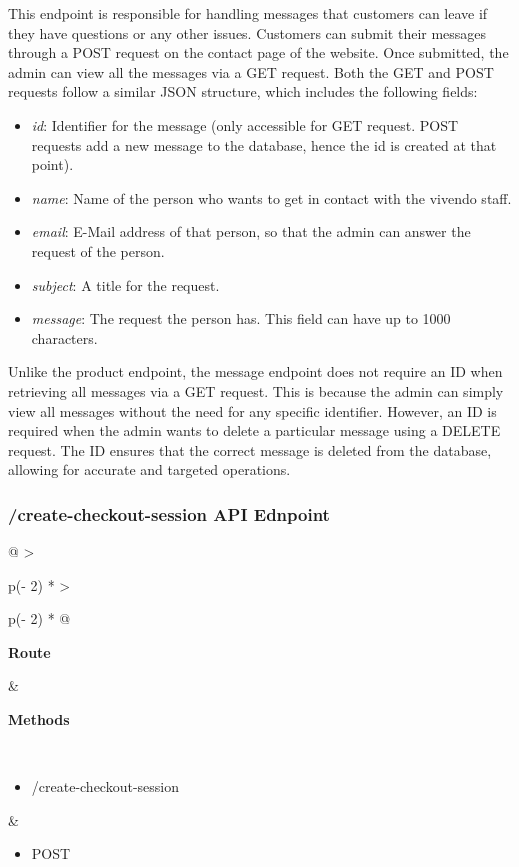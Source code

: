 This endpoint is responsible for handling messages that customers can leave if they have questions or any other issues. Customers can submit their messages through a POST request on the contact page of the website. Once submitted, the admin can view all the messages via a GET request. Both the GET and POST requests follow a similar JSON structure, which includes the following fields:

\begin{itemize}
    \item \textit{id}: Identifier for the message (only accessible for GET request. POST requests add a new message to the database, hence the id is created at that point).
    \item \textit{name}: Name of the person who wants to get in contact with the vivendo staff.
    \item \textit{email}: E-Mail address of that person, so that the admin can answer the request of the person.
    \item \textit{subject}: A title for the request.
    \item \textit{message}: The request the person has. This field can have up to 1000 characters.
\end{itemize}

Unlike the product endpoint, the message endpoint does not require an ID when retrieving all messages via a GET request. This is because the admin can simply view all messages without the need for any specific identifier. However, an ID is required when the admin wants to delete a particular message using a DELETE request. The ID ensures that the correct message is deleted from the database, allowing for accurate and targeted operations.

\subsubsection{/create-checkout-session API Ednpoint}

\begin{longtable}[]{@{}
    >{\raggedright\arraybackslash}p{(\columnwidth - 2\tabcolsep) * }
    >{\raggedright\arraybackslash}p{(\columnwidth - 2\tabcolsep) * }@{}}
\toprule
\begin{minipage}[b]{\linewidth}\raggedright
\textbf{Route}
\end{minipage} & \begin{minipage}[b]{\linewidth}\raggedright
\textbf{Methods}
\end{minipage} \\
\midrule
\endhead
\begin{itemize}
    \item /create-checkout-session
\end{itemize} &
\begin{itemize}
    \item POST
\end{itemize} \\
\bottomrule
\end{longtable}

